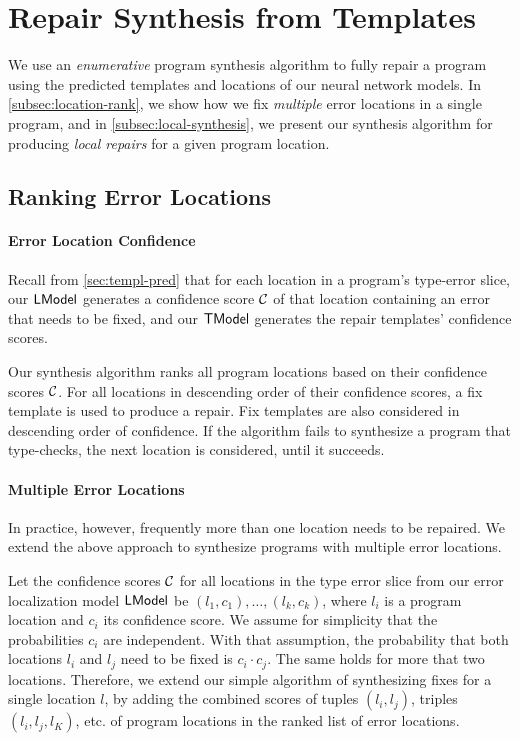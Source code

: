\section{Repair Synthesis from Templates}
\label{sec:synthesis}
We use an \emph{enumerative} program synthesis algorithm to fully repair a
program using the predicted templates and locations of our neural network
models. In \autoref{subsec:location-rank}, we show how we fix \emph{multiple}
error locations in a single program, and in \autoref{subsec:local-synthesis}, we
present our synthesis algorithm for producing \emph{local repairs} for a given
program location.

\subsection{Ranking Error Locations}
\label{subsec:location-rank}

\paragraph{Error Location Confidence}
Recall from \autoref{sec:templ-pred} that for each location in a program's
type-error slice, our $\mathsf{LModel}$ generates a confidence score $\mathcal{C}$ of that
location containing an error that needs to be fixed, and our $\mathsf{TModel}$ generates
the repair templates' confidence scores.

Our synthesis algorithm ranks all program locations based on their confidence
scores $\mathcal{C}$. For all locations in descending order of their confidence
scores, a fix template is used to produce a repair. Fix templates are also
considered in descending order of confidence. If the algorithm fails to
synthesize a program that type-checks, the next location is considered, until it
succeeds.

\paragraph{Multiple Error Locations}
In practice, however, frequently more than one location needs to be repaired. We
extend the above approach to synthesize programs with multiple error locations.

Let the confidence scores $\mathcal{C}$ for all locations in the type error slice from
our error localization model $\mathsf{LModel}$ be $(l_1, c_1), \dots, (l_k, c_k)$, where
$l_i$ is a program location and $c_i$ its confidence score. We assume for
simplicity that the probabilities $c_i$ are independent. With that assumption,
the probability that both locations $l_i$ and $l_j$ need to be fixed is $c_i
\cdot c_j$. The same holds for more that two locations. Therefore, we extend our
simple algorithm of synthesizing fixes for a single location $l$, by adding the
combined scores of tuples $(l_i, l_j)$, triples $(l_i, l_j, l_K)$, etc. of
program locations in the ranked list of error locations.


